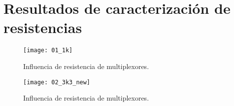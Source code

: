 \newpage                      
\section{Resultados de caracterización de resistencias}  

            \begin{table}[htbp]
                \caption{Resistencia de multiplexores.}
                \begin{center}
                \label{tab:Mux_res}
                \end{center}
            \end{table}

            \begin{figure}[hbtp]
                \centering
                \texttt{[image: 01\_1k]}
                \caption{Influencia de resistencia de multiplexores.}
                \label{fig:01_1k}
            \end{figure}  
            
            \begin{figure}[hbtp]
                \centering
                \texttt{[image: 02\_3k3\_new]}
                \caption{Influencia de resistencia de multiplexores.}
                \label{fig:02_3k3_new}
            \end{figure}              
 
